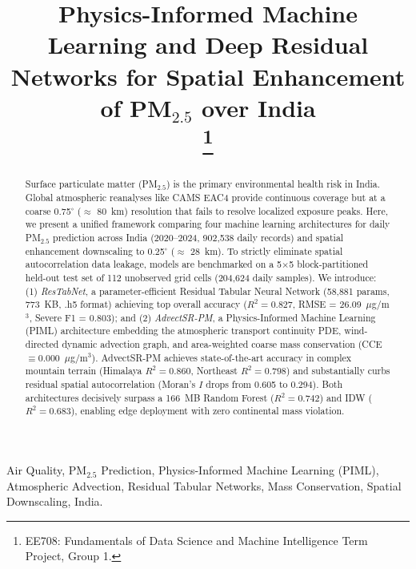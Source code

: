 \documentclass[conference]{IEEEtran}
\begin{document}
\title{Physics-Informed Machine Learning and Deep Residual Networks for Spatial Enhancement of PM$_{2.5}$ over India\\
\thanks{EE708: Fundamentals of Data Science and Machine Intelligence Term Project, Group 1.}
}

\author{
}

\maketitle

\begin{abstract}
Surface particulate matter (PM$_{2.5}$) is the primary environmental health risk in India. Global atmospheric reanalyses like CAMS EAC4 provide continuous coverage but at a coarse 0.75$^\circ$ ($\approx$ 80~km) resolution that fails to resolve localized exposure peaks. Here, we present a unified framework comparing four machine learning architectures for daily PM$_{2.5}$ prediction across India (2020--2024, 902,538 daily records) and spatial enhancement downscaling to 0.25$^\circ$ ($\approx$ 28~km). To strictly eliminate spatial autocorrelation data leakage, models are benchmarked on a 5$\times$5 block-partitioned held-out test set of 112 unobserved grid cells (204,624 daily samples). We introduce: (1) \textit{ResTabNet}, a parameter-efficient Residual Tabular Neural Network (58,881 params, 773~KB, .h5 format) achieving top overall accuracy ($R^2 = 0.827$, RMSE = 26.09~$\mu$g/m$^3$, Severe F1 = 0.803); and (2) \textit{AdvectSR-PM}, a Physics-Informed Machine Learning (PIML) architecture embedding the atmospheric transport continuity PDE, wind-directed dynamic advection graph, and area-weighted coarse mass conservation (CCE $\equiv 0.000$~$\mu$g/m$^3$). AdvectSR-PM achieves state-of-the-art accuracy in complex mountain terrain (Himalaya $R^2 = 0.860$, Northeast $R^2 = 0.798$) and substantially curbs residual spatial autocorrelation (Moran's $I$ drops from 0.605 to 0.294). Both architectures decisively surpass a 166~MB Random Forest ($R^2 = 0.742$) and IDW ($R^2 = 0.683$), enabling edge deployment with zero continental mass violation.
\end{abstract}

\begin{IEEEkeywords}
Air Quality, PM$_{2.5}$ Prediction, Physics-Informed Machine Learning (PIML), Atmospheric Advection, Residual Tabular Networks, Mass Conservation, Spatial Downscaling, India.
\end{IEEEkeywords}
\end{document}
